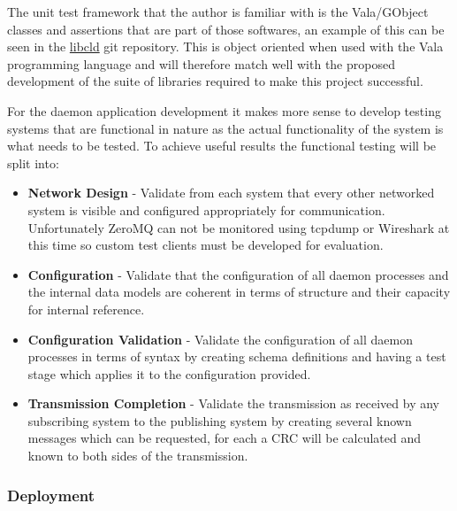\documentclass[11pt]{article}
\begin{document}
          The unit test framework that the author is familiar with is the
          Vala/GObject classes and assertions that are part of those softwares,
          an example of this can be seen in the
          \href{https://github.com/geoffjay/libcld/tree/master/tests}{libcld} git
          repository. This is object oriented when used with the Vala programming
          language and will therefore match well with the proposed development of
          the suite of libraries required to make this project successful.

          For the daemon application development it makes more sense to develop
          testing systems that are functional in nature as the actual functionality
          of the system is what needs to be tested. To achieve useful results the
          functional testing will be split into:

          \begin{itemize}
            \item \textbf{Network Design} - Validate from each system that every
                  other networked system is visible and configured appropriately
                  for communication. Unfortunately ZeroMQ can not be monitored
                  using tcpdump or Wireshark at this time so custom test clients
                  must be developed for evaluation.
            \item \textbf{Configuration} - Validate that the configuration of
                  all daemon processes and the internal data models are coherent
                  in terms of structure and their capacity for internal
                  reference.
            \item \textbf{Configuration Validation} - Validate the configuration
                  of all daemon processes in terms of syntax by creating schema
                  definitions and having a test stage which applies it to the
                  configuration provided.
            \item \textbf{Transmission Completion} - Validate the transmission
                  as received by any subscribing system to the publishing system
                  by creating several known messages which can be requested, for
                  each a CRC will be calculated and known to both sides of the
                  transmission.
          \end{itemize}

        \subsubsection{Deployment}\label{sec:soln-model-deploy}
\end{document}
